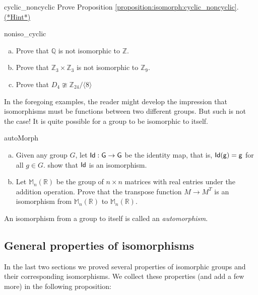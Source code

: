 \begin{exercise}{cyclic_noncyclic} 
Prove Proposition \ref{proposition:isomorph:cyclic_noncyclic}.
\hyperref[sec:isomorph:hints]{(*Hint*)}
\end{exercise}



\begin{exercise}{noniso_cyclic}
\begin{enumerate}[(a)]
\item
Prove that ${\mathbb Q}$ is not isomorphic to ${\mathbb Z}$.
\item
Prove that  ${\mathbb Z}_3 \times {\mathbb Z}_3$ is not isomorphic to ${\mathbb Z}_9$. 
\item
Prove that  $D_4 \ncong {\mathbb Z}_{24} / \langle 8 \rangle$
\end{enumerate}
\end{exercise}

In the foregoing examples, the reader might develop the impression that isomorphisms must be functions between two different groups. But such is not the case!  It is quite possible for a group to be isomorphic to itself.

\begin{exercise}{autoMorph}
\begin{enumerate}[(a)]
\item
Given any group $G$, let $\sf{Id}:G \rightarrow G$ be the identity map, that is, $\sf{Id}(g)=g$ for all $g \in G$.  show that $\sf{Id}$ is an isomorphism.
\item
Let $\mathbb{M}_n(\mathbb{R})$ be the group of $n\times n$ matrices with real entries under the addition operation. Prove that the transpose function $M \rightarrow M^T$ is an isomorphism from  $\mathbb{M}_n(\mathbb{R})$ to $\mathbb{M}_n(\mathbb{R})$.
\end{enumerate}
\end{exercise}

An isomorphism from a group to itself is called an \emph{automorphism}.


\subsection{General properties of isomorphisms\quad
{}}\label{iso_properties}
In the last two sections we  proved several properties of isomorphic groups and their corresponding isomorphisms.  We collect these properties (and add a few more) in the following proposition:


